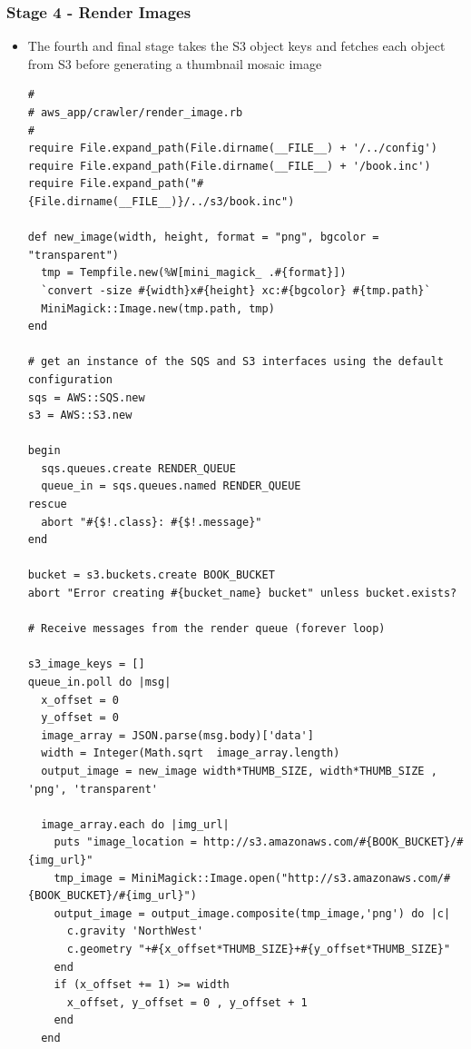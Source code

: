 \documentclass{beamer}
\begin{document}
\begin{frame}
\frametitle{Stage 4 - Render Images}
\begin{itemize}
\item The fourth and final stage takes the S3 object keys and fetches each object from S3
before generating a thumbnail mosaic image

\lstset{language=Ruby, style=eclipse}
\begin{lstlisting}[escapechar=&]
#
# aws_app/crawler/render_image.rb
#
require File.expand_path(File.dirname(__FILE__) + '/../config')
require File.expand_path(File.dirname(__FILE__) + '/book.inc')
require File.expand_path("#{File.dirname(__FILE__)}/../s3/book.inc")

def new_image(width, height, format = "png", bgcolor = "transparent")
  tmp = Tempfile.new(%W[mini_magick_ .#{format}])
  `convert -size #{width}x#{height} xc:#{bgcolor} #{tmp.path}`
  MiniMagick::Image.new(tmp.path, tmp)
end

# get an instance of the SQS and S3 interfaces using the default configuration
sqs = AWS::SQS.new
s3 = AWS::S3.new

begin
  sqs.queues.create RENDER_QUEUE
  queue_in = sqs.queues.named RENDER_QUEUE
rescue
  abort "#{$!.class}: #{$!.message}"
end

bucket = s3.buckets.create BOOK_BUCKET
abort "Error creating #{bucket_name} bucket" unless bucket.exists?

# Receive messages from the render queue (forever loop)

s3_image_keys = []
queue_in.poll do |msg|
  x_offset = 0
  y_offset = 0
  image_array = JSON.parse(msg.body)['data']
  width = Integer(Math.sqrt  image_array.length)
  output_image = new_image width*THUMB_SIZE, width*THUMB_SIZE , 'png', 'transparent'

  image_array.each do |img_url|
    puts "image_location = http://s3.amazonaws.com/#{BOOK_BUCKET}/#{img_url}"
    tmp_image = MiniMagick::Image.open("http://s3.amazonaws.com/#{BOOK_BUCKET}/#{img_url}")
    output_image = output_image.composite(tmp_image,'png') do |c|
      c.gravity 'NorthWest'
      c.geometry "+#{x_offset*THUMB_SIZE}+#{y_offset*THUMB_SIZE}"
    end
    if (x_offset += 1) >= width
      x_offset, y_offset = 0 , y_offset + 1
    end
  end


\end{lstlisting}
\end{itemize}
\end{frame}
\end{document}
